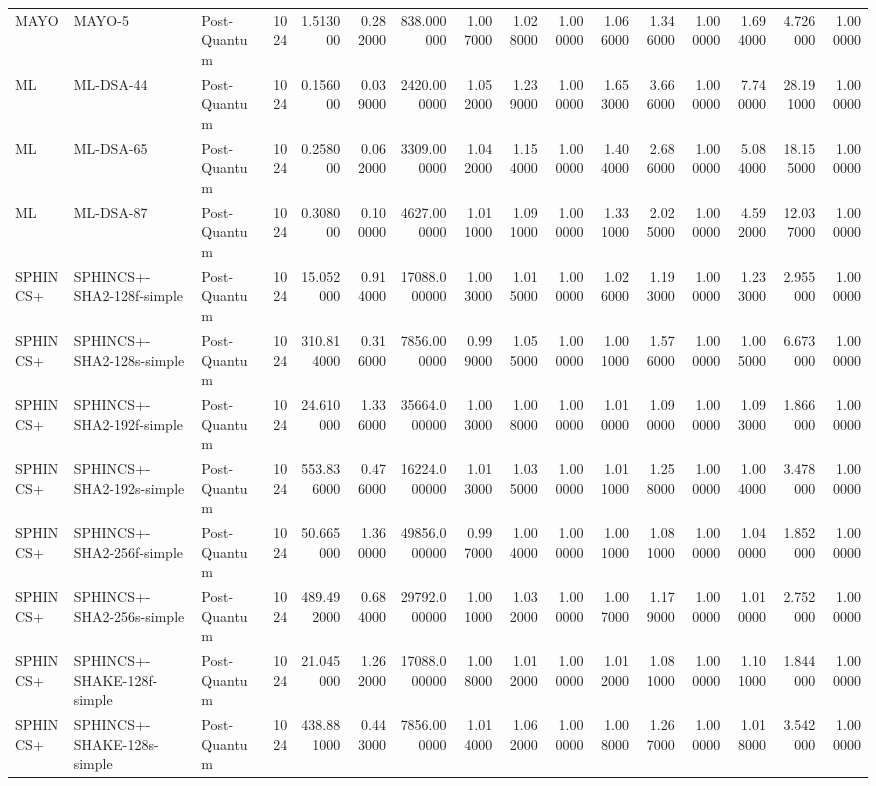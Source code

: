 \begin{table}
\begin{tabular}{lllrrrrrrrrrrrrr}
MAYO & MAYO-5 & Post-Quantum & 1024 & 1.513000 & 0.282000 & 838.000000 & 1.007000 & 1.028000 & 1.000000 & 1.066000 & 1.346000 & 1.000000 & 1.694000 & 4.726000 & 1.000000 \\
ML & ML-DSA-44 & Post-Quantum & 1024 & 0.156000 & 0.039000 & 2420.000000 & 1.052000 & 1.239000 & 1.000000 & 1.653000 & 3.666000 & 1.000000 & 7.740000 & 28.191000 & 1.000000 \\
ML & ML-DSA-65 & Post-Quantum & 1024 & 0.258000 & 0.062000 & 3309.000000 & 1.042000 & 1.154000 & 1.000000 & 1.404000 & 2.686000 & 1.000000 & 5.084000 & 18.155000 & 1.000000 \\
ML & ML-DSA-87 & Post-Quantum & 1024 & 0.308000 & 0.100000 & 4627.000000 & 1.011000 & 1.091000 & 1.000000 & 1.331000 & 2.025000 & 1.000000 & 4.592000 & 12.037000 & 1.000000 \\
SPHINCS+ & SPHINCS+-SHA2-128f-simple & Post-Quantum & 1024 & 15.052000 & 0.914000 & 17088.000000 & 1.003000 & 1.015000 & 1.000000 & 1.026000 & 1.193000 & 1.000000 & 1.233000 & 2.955000 & 1.000000 \\
SPHINCS+ & SPHINCS+-SHA2-128s-simple & Post-Quantum & 1024 & 310.814000 & 0.316000 & 7856.000000 & 0.999000 & 1.055000 & 1.000000 & 1.001000 & 1.576000 & 1.000000 & 1.005000 & 6.673000 & 1.000000 \\
SPHINCS+ & SPHINCS+-SHA2-192f-simple & Post-Quantum & 1024 & 24.610000 & 1.336000 & 35664.000000 & 1.003000 & 1.008000 & 1.000000 & 1.010000 & 1.090000 & 1.000000 & 1.093000 & 1.866000 & 1.000000 \\
SPHINCS+ & SPHINCS+-SHA2-192s-simple & Post-Quantum & 1024 & 553.836000 & 0.476000 & 16224.000000 & 1.013000 & 1.035000 & 1.000000 & 1.011000 & 1.258000 & 1.000000 & 1.004000 & 3.478000 & 1.000000 \\
SPHINCS+ & SPHINCS+-SHA2-256f-simple & Post-Quantum & 1024 & 50.665000 & 1.360000 & 49856.000000 & 0.997000 & 1.004000 & 1.000000 & 1.001000 & 1.081000 & 1.000000 & 1.040000 & 1.852000 & 1.000000 \\
SPHINCS+ & SPHINCS+-SHA2-256s-simple & Post-Quantum & 1024 & 489.492000 & 0.684000 & 29792.000000 & 1.001000 & 1.032000 & 1.000000 & 1.007000 & 1.179000 & 1.000000 & 1.010000 & 2.752000 & 1.000000 \\
SPHINCS+ & SPHINCS+-SHAKE-128f-simple & Post-Quantum & 1024 & 21.045000 & 1.262000 & 17088.000000 & 1.008000 & 1.012000 & 1.000000 & 1.012000 & 1.081000 & 1.000000 & 1.101000 & 1.844000 & 1.000000 \\
SPHINCS+ & SPHINCS+-SHAKE-128s-simple & Post-Quantum & 1024 & 438.881000 & 0.443000 & 7856.000000 & 1.014000 & 1.062000 & 1.000000 & 1.008000 & 1.267000 & 1.000000 & 1.018000 & 3.542000 & 1.000000 \\

\end{tabular}
\end{table}
